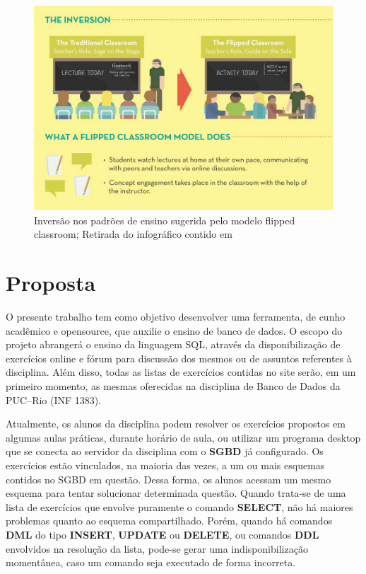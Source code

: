 \documentclass[graduacao,brazil]{ThesisPUC}
\begin{document}
\begin{figure}[H]
    \centering
    \includegraphics[width=\linewidth]{Imagens/flipped_classroom.png}
    \caption{Invers\~{a}o nos padr\~{o}es de ensino sugerida pelo modelo flipped classroom;
	     Retirada do infogr\'{a}fico contido em \cite{FlippedLearning}}
\end{figure}


\chapter{Proposta}

O presente trabalho tem como objetivo desenvolver uma ferramenta, de cunho acad\^{e}mico
e opensource, que auxilie o ensino de banco de dados. O escopo do projeto abranger\'{a} o ensino
da linguagem SQL, atrav\'{e}s da disponibiliza\c{c}\~{a}o de exerc\'{i}cios online e f\'{o}rum para discuss\~{a}o dos
mesmos ou de assuntos referentes \`{a} disciplina. Al\'{e}m disso, todas as listas de exerc\'{i}cios contidas
no site ser\~{a}o, em um primeiro momento, as mesmas oferecidas na disciplina de Banco de Dados
da PUC--Rio (INF 1383).

Atualmente, os alunos da disciplina podem resolver os exerc\'{i}cios propostos em algumas
aulas pr\'{a}ticas, durante hor\'{a}rio de aula, ou utilizar um programa desktop que se conecta ao
servidor da disciplina com o \textbf{SGBD} \cite{ElmasriNavathe05} j\'{a} configurado. 
Os exerc\'{i}cios est\~{a}o vinculados, na maioria das vezes, a um ou mais esquemas contidos no SGBD 
em quest\~{a}o. Dessa forma, os alunos acessam um mesmo esquema para tentar solucionar determinada quest\~{a}o.
Quando trata-se de uma lista de exerc\'{i}cios que envolve puramente o comando \textbf{SELECT}, n\~{a}o h\'{a}
maiores problemas quanto ao esquema compartilhado.
Por\'{e}m, quando h\'{a} comandos \textbf{DML}\cite{ElmasriNavathe05} do tipo \textbf{INSERT}, \textbf{UPDATE} ou
\textbf{DELETE}, ou comandos \textbf{DDL}\cite{ElmasriNavathe05} envolvidos na resolu\c{c}\~{a}o da lista, pode-se
gerar uma indisponibiliza\c{c}\~{a}o moment\^{a}nea, caso um comando seja executado de forma incorreta.
\end{document}
